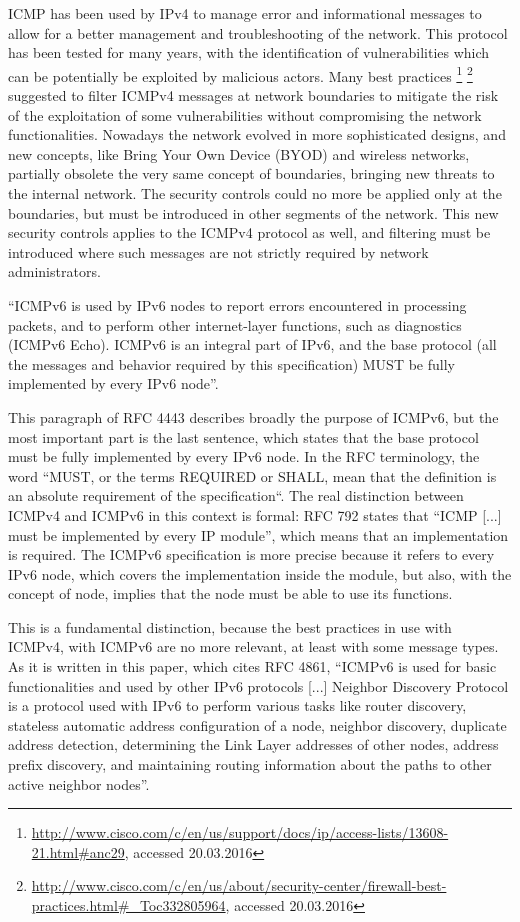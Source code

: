 \documentclass[12pt]{article}
\begin{document}
ICMP has been used by IPv4 to manage error and informational messages to allow for a better management and troubleshooting of the network.  This protocol has been tested for many years, with the identification of vulnerabilities which can be potentially be exploited by malicious actors. Many best practices \footnote{\url{http://www.cisco.com/c/en/us/support/docs/ip/access-lists/13608-21.html\#anc29}, accessed 20.03.2016} \footnote{\url{http://www.cisco.com/c/en/us/about/security-center/firewall-best-practices.html\#\_Toc332805964}, accessed 20.03.2016} suggested to filter ICMPv4 messages at network boundaries to mitigate the risk of the exploitation of some vulnerabilities without compromising the network functionalities. Nowadays the network evolved in more sophisticated designs, and new concepts, like Bring Your Own Device (BYOD) and wireless networks, partially obsolete the very same concept of boundaries, bringing new threats to the internal network. The security controls could no more be applied only at the boundaries, but must be introduced in other segments of the network. This new security controls applies to the ICMPv4 protocol as well, and filtering must be introduced where such messages are not strictly required by network administrators.

``ICMPv6 is used by IPv6 nodes to report errors encountered in processing packets, and to perform other internet-layer functions, such as diagnostics (ICMPv6 Echo). ICMPv6 is an integral part of IPv6, and the base protocol (all the messages and behavior required by this specification) MUST be fully implemented by every IPv6 node''\cite{rfc4443}.

This paragraph of RFC 4443 describes broadly the purpose of ICMPv6, but the most important part is the last sentence, which states that the base protocol must be fully implemented by every IPv6 node. In the RFC terminology, the word “MUST, or the terms REQUIRED or SHALL, mean that the definition is an absolute requirement of the specification“\cite{rfc2119}. The real distinction between ICMPv4 and ICMPv6 in this context is formal: RFC 792 states that ``ICMP [...] must be implemented by every IP module''\cite{rfc792}, which means that an implementation is required. The ICMPv6 specification is more precise because it refers to every IPv6 node, which covers the implementation inside the module, but also, with the concept of node, implies that the node must be able to use its functions.

This is a fundamental distinction, because the best practices in use with ICMPv4, with ICMPv6 are no more relevant, at least with some message types. As it is written in this paper\cite{chak}, which cites RFC 4861\cite{rfc4861}, ``ICMPv6 is used for basic functionalities and used by other IPv6 protocols [...] Neighbor Discovery Protocol is a protocol used with IPv6 to perform various tasks like router discovery, stateless automatic address configuration of a node, neighbor discovery, duplicate address detection, determining the Link Layer addresses of other nodes, address prefix discovery, and maintaining routing information about the paths to other active neighbor nodes''.
\end{document}
